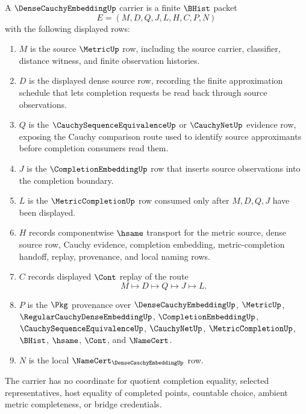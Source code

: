 \begin{definition}
\label{def:dense-cauchy-embedding-carrier}
A $\DenseCauchyEmbeddingUp$ carrier is a finite $\BHist$ packet
$$
E=(M,D,Q,J,L,H,C,P,N)
$$
with the following displayed rows:
\begin{enumerate}
\item $M$ is the source $\MetricUp$ row, including the source carrier, classifier, distance witness, and finite observation histories.
\item $D$ is the displayed dense source row, recording the finite approximation schedule that lets completion requests be read back through source observations.
\item $Q$ is the $\CauchySequenceEquivalenceUp$ or $\CauchyNetUp$ evidence row, exposing the Cauchy comparison route used to identify source approximants before completion consumers read them.
\item $J$ is the $\CompletionEmbeddingUp$ row that inserts source observations into the completion boundary.
\item $L$ is the $\MetricCompletionUp$ row consumed only after $M,D,Q,J$ have been displayed.
\item $H$ records componentwise $\hsame$ transport for the metric source, dense source row, Cauchy evidence, completion embedding, metric-completion handoff, replay, provenance, and local naming rows.
\item $C$ records displayed $\Cont$ replay of the route
$$
M \longmapsto D \longmapsto Q \longmapsto J \longmapsto L .
$$
\item $P$ is the $\Pkg$ provenance over $\DenseCauchyEmbeddingUp$, $\MetricUp$, $\RegularCauchyDenseEmbeddingUp$, $\CompletionEmbeddingUp$, $\CauchySequenceEquivalenceUp$, $\CauchyNetUp$, $\MetricCompletionUp$, $\BHist$, $\hsame$, $\Cont$, and $\NameCert$.
\item $N$ is the local $\NameCert_{\DenseCauchyEmbeddingUp}$ row.
\end{enumerate}
The carrier has no coordinate for quotient completion equality, selected representatives, host equality of completed points, countable choice, ambient metric completeness, or bridge credentials.
\end{definition}

